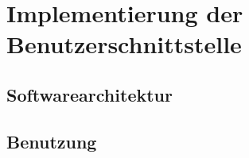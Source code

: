 \section{Implementierung der Benutzerschnittstelle}

\subsection{Softwarearchitektur}

\subsection{Benutzung}